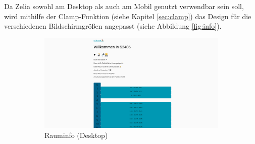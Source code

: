 
\clearpage
{}

Da Zelia sowohl am Desktop als auch am Mobil genutzt verwendbar sein soll, wird mithilfe der Clamp-Funktion (siehe Kapitel \ref{sec:clamp}) das Design für die verschiedenen Bildschirmgrößen angepasst (siehe Abbildung \ref{fig:info}).


\begin{figure}[H]
    \begin{subfigure}[c]{0.65\textwidth}
        \centering
        \includegraphics[width=\textwidth]{media/ResponsiveDesign/ZeliaDesktop.png}
        \caption{Rauminfo (Desktop)}
    \end{subfigure} \hfill
    \begin{subfigure}[c]{0.35\textwidth}
        \centering

\end{subfigure}
\end{figure}
